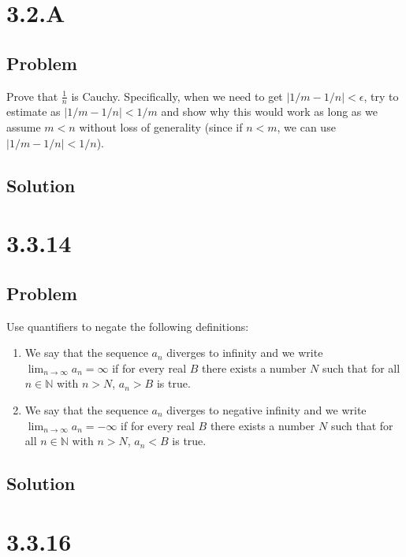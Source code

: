 \documentclass[12pt]{article}
\newcommand{\N}    [0]{\mathbb{N}                   }
\begin{document}
\section*{3.2.A}

\subsection*{Problem}
Prove that $\frac{1}{n}$ is Cauchy. Specifically, when we need to get $|1/m - 1/n| < \epsilon$, try to estimate as $|1/m - 1/n| < 1/m$ and show why this would work as long as we assume $m<n$ without loss of generality (since if $n<m$, we can use $|1/m - 1/n| < 1/n$).

\subsection*{Solution}



\section*{3.3.14}

\subsection*{Problem}
Use quantifiers to negate the following definitions:

\begin{enumerate}
    \item We say that the sequence $a_n$ diverges to infinity and we write $\lim_{n \to \infty} a_n = \infty$ if for every real $B$ there exists a number $N$ such that for all $n \in \N$ with $n > N$, $a_n > B$ is true.
    \item We say that the sequence $a_n$ diverges to negative infinity and we write $\lim_{n \to \infty} a_n = -\infty$ if for every real $B$ there exists a number $N$ such that for all $n \in \N$ with $n > N$, $a_n < B$ is true.
\end{enumerate}

\subsection*{Solution}



\section*{3.3.16}
\end{document}
